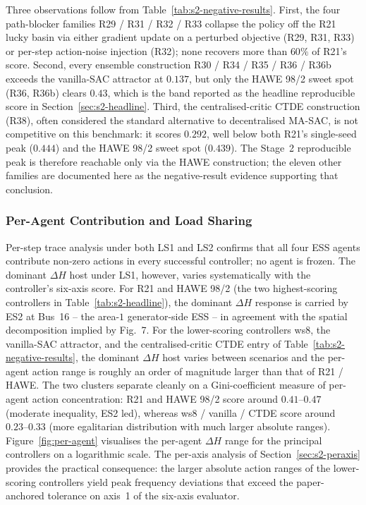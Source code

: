 \documentclass{unnc-fyp}
\begin{document}
Three observations follow from
Table~\ref{tab:s2-negative-results}.
First, the four path-blocker families R29 / R31 / R32 / R33
collapse the policy off the R21 lucky basin via either gradient
update on a perturbed objective (R29, R31, R33) or per-step
action-noise injection (R32); none recovers more than $60\%$ of
R21's score.
Second, every ensemble construction R30 / R34 / R35 / R36 / R36b
exceeds the vanilla-SAC attractor at $0.137$, but only the
HAWE 98/2 sweet spot (R36, R36b) clears $0.43$, which is the band
reported as the headline reproducible score in
Section~\ref{sec:s2-headline}.
Third, the centralised-critic CTDE construction (R38), often
considered the standard alternative to decentralised MA-SAC, is
not competitive on this benchmark: it scores $0.292$, well below
both R21's single-seed peak ($0.444$) and the HAWE 98/2 sweet spot
($0.439$).
The Stage~2 reproducible peak is therefore reachable only via the
HAWE construction; the eleven other families are documented here
as the negative-result evidence supporting that conclusion.

\subsubsection{Per-Agent Contribution and Load Sharing}
\label{sec:s2-peragent}

Per-step trace analysis under both LS1 and LS2 confirms that all
four ESS agents contribute non-zero actions in every successful
controller; no agent is frozen.
The dominant $\Delta H$ host under LS1, however, varies
systematically with the controller's six-axis score.
For R21 and HAWE 98/2 (the two highest-scoring controllers in
Table~\ref{tab:s2-headline}), the dominant $\Delta H$ response is
carried by ES2 at Bus~16 -- the area-$1$ generator-side ESS --
in agreement with the spatial decomposition implied by
\cite{yang2023ddic} Fig.~7.
For the lower-scoring controllers ws8, the vanilla-SAC attractor,
and the centralised-critic CTDE entry of
Table~\ref{tab:s2-negative-results}, the dominant $\Delta H$
host varies between scenarios and the per-agent action range is
roughly an order of magnitude larger than that of R21 / HAWE.
The two clusters separate cleanly on a Gini-coefficient measure
of per-agent action concentration: R21 and HAWE 98/2 score
around $0.41\text{--}0.47$ (moderate inequality, ES2 led),
whereas ws8 / vanilla / CTDE score around $0.23\text{--}0.33$
(more egalitarian distribution with much larger absolute ranges).
Figure~\ref{fig:per-agent} visualises the per-agent $\Delta H$
range for the principal controllers on a logarithmic scale.
The per-axis analysis of Section~\ref{sec:s2-peraxis} provides
the practical consequence: the larger absolute action ranges of
the lower-scoring controllers yield peak frequency deviations
that exceed the paper-anchored tolerance on axis~1 of the
six-axis evaluator.
\end{document}
